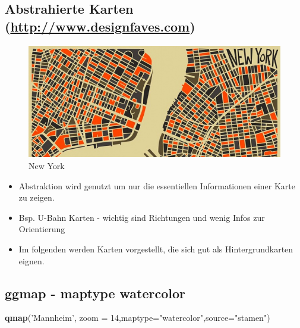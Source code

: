 \documentclass[]{article}
\newenvironment{Shaded}{\begin{snugshade}}{\end{snugshade}}
\newcommand{\KeywordTok}[1]{\textcolor[rgb]{0.13,0.29,0.53}{\textbf{{#1}}}}
\newcommand{\DataTypeTok}[1]{\textcolor[rgb]{0.13,0.29,0.53}{{#1}}}
\newcommand{\DecValTok}[1]{\textcolor[rgb]{0.00,0.00,0.81}{{#1}}}
\newcommand{\StringTok}[1]{\textcolor[rgb]{0.31,0.60,0.02}{{#1}}}
\newcommand{\NormalTok}[1]{{#1}}
\begin{document}
\subsection{\texorpdfstring{Abstrahierte Karten
(\href{http://www.designfaves.com/2014/03/abstracted-maps-reveal-cities-personalities}{http://www.designfaves.com})}{Abstrahierte Karten (http://www.designfaves.com)}}\label{abstrahierte-karten-httpwww.designfaves.com}

\begin{figure}[htbp]
\centering
\includegraphics{figure/NYabstracted.jpg}
\caption{New York}
\end{figure}

\begin{itemize}
\item
  Abstraktion wird genutzt um nur die essentiellen Informationen einer
  Karte zu zeigen.
\item
  Bsp. U-Bahn Karten - wichtig sind Richtungen und wenig Infos zur
  Orientierung
\item
  Im folgenden werden Karten vorgestellt, die sich gut als
  Hintergrundkarten eignen.
\end{itemize}

\subsection{ggmap - maptype
watercolor}\label{ggmap---maptype-watercolor}

\begin{Shaded}
\begin{Highlighting}[]
\KeywordTok{qmap}\NormalTok{(}\StringTok{'Mannheim'}\NormalTok{, }\DataTypeTok{zoom =} \DecValTok{14}\NormalTok{,}\DataTypeTok{maptype=}\StringTok{"watercolor"}\NormalTok{,}\DataTypeTok{source=}\StringTok{"stamen"}\NormalTok{)}
\end{Highlighting}
\end{Shaded}
\end{document}
